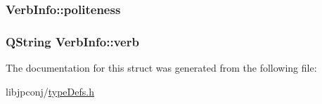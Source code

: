 \subsubsection[{\texorpdfstring{politeness}{politeness}}]{ Verb\+Info\+::politeness}\hypertarget{struct_verb_info_a39c85beda0f6c34824f1c687b55fdc88}{}\label{struct_verb_info_a39c85beda0f6c34824f1c687b55fdc88}
\subsubsection[{\texorpdfstring{verb}{verb}}]{\setlength{\rightskip}{0pt plus 5cm}Q\+String Verb\+Info\+::verb}\hypertarget{struct_verb_info_acde65c6cfad112c1811570cb325a44f8}{}\label{struct_verb_info_acde65c6cfad112c1811570cb325a44f8}


The documentation for this struct was generated from the following file\+:\begin{DoxyCompactItemize}
\item 
libjpconj/\hyperlink{type_defs_8h}{type\+Defs.\+h}\end{DoxyCompactItemize}
